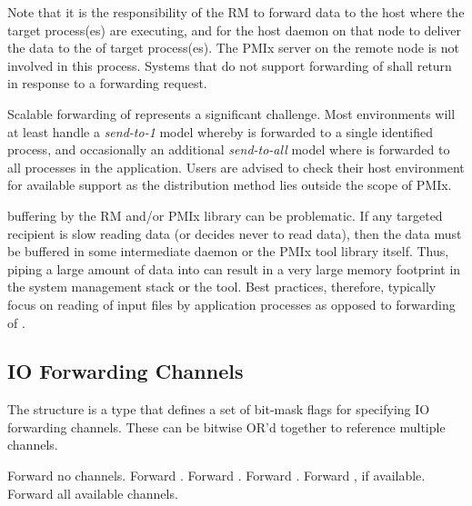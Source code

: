 Note that it is the responsibility of the \ac{RM} to forward data to the host where the target process(es) are executing, and for the host daemon on that node to deliver the data to the  of target process(es). The \ac{PMIx} server on the remote node is not involved in this process. Systems that do not support forwarding of  shall return  in response to a forwarding request.

\adviceuserstart
Scalable forwarding of  represents a significant challenge. Most environments will at least handle a \emph{send-to-1} model whereby  is forwarded to a single identified process, and occasionally an additional \emph{send-to-all} model where  is forwarded to all processes in the application. Users are advised to check their host environment for available support as the distribution method lies outside the scope of \ac{PMIx}.

 buffering by the \ac{RM} and/or \ac{PMIx} library can be problematic. If any targeted recipient is slow reading data (or decides never to read data), then the data must be buffered in some intermediate daemon or the \ac{PMIx} tool library itself. Thus, piping a large amount of data into  can result in a very large memory footprint in the system management stack or the tool. Best practices, therefore, typically focus on reading of input files by application processes as opposed to forwarding of .
\adviceuserend


\subsection{IO Forwarding Channels}
\label{api:tool:iofchannels}

The  structure is a  type that defines a set of bit-mask flags for specifying IO forwarding channels. These can be bitwise OR'd together to reference multiple channels.

\begin{constantdesc}
%
Forward no channels.
%
Forward .
%
Forward .
%
Forward .
%
Forward , if available.
%
Forward all available channels.
%
\end{constantdesc}

